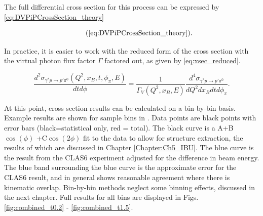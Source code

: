 The full differential cross section for this process can be expressed by \eqref{eq:DVPiPCrossSection_theory}

        \begin{equation*}
          \recallLabel{eq:DVPiPCrossSection_theory}.
        \end{equation*}

In practice, it is easier to work with the reduced form of the cross section with the virtual photon flux factor $\Gamma$ factored out, as given by \eqref{eq:xsec_reduced}.

 \begin{equation}\label{eq:xsec_reduced}
    \frac{d^2\sigma_{\gamma^*p \rightarrow p'\pi^0}(Q^2,x_B,t,\phi_{\pi},E)}{dtd\phi} = \frac{1}{\Gamma_V(Q^2,x_B,E)} \frac{d^4\sigma_{\gamma^*p \rightarrow p'\pi^0}}{dQ^2dx_Bdtd\phi_{\pi}}.
\end{equation}

At this point, cross section results can be calculated on a bin-by-bin basis. Example results are shown for sample bins in . Data points are black points with error bars (black=statistical only, red = total). The black curve is a A+B$\cos(\phi)$ +C$\cos(2\phi)$ fit to the data to allow for structure extraction, the results of which are discussed in Chapter \ref{Chapter:Ch5_IBU}. The blue curve is the result from the CLAS6 experiment \parencite{Bedlinskiy2014ExclusiveCLAS} adjusted for the difference in beam energy. The blue band surrounding the blue curve is the approximate error for the CLAS6 result, and in general shows reasonable agreement where there is kinematic overlap. Bin-by-bin methods neglect some binning effects, discussed in the next chapter. Full results for all bins are displayed in Figs. \ref{fig:combined_t0.2} - \ref{fig:combined_t1.5}.

